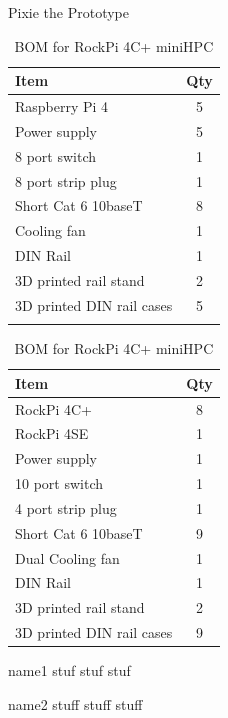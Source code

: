 \documentclass[final]{beamer}
\newlength{\sepwidth}
\newlength{\colwidth}
\newcommand{\separatorcolumn}{\begin{column}{\sepwidth}\end{column}}
\begin{document}
\begin{frame}[t]
\begin{columns}[t]
\begin{column}{\colwidth}
				\begin{alertblock}{Pixie the Prototype}
					\begin{table}
						\parbox{.45\linewidth}{
						\centering
						\begin{tabular}{l c}
							\textbf{Item} & \textbf{Qty} \\
							\hline
							Raspberry Pi 4 & 5 \\
							Power supply & 5 \\
							8 port switch & 1 \\
							8 port strip plug & 1 \\
							Short Cat 6 10baseT & 8 \\
							Cooling fan & 1 \\
							DIN Rail & 1 \\
							3D printed rail stand & 2 \\
							3D printed DIN rail cases & 5 \\
							 & \\
						\end{tabular}
						\caption{BOM for Prototype miniHPC using Raspberry Pi 4s}			
						}
						\hfill
						\parbox{.45\linewidth}{
						\centering
						\begin{tabular}{l c}
							\textbf{Item} & \textbf{Qty} \\
							\hline
							RockPi 4C+ & 8 \\
							RockPi 4SE & 1 \\
							Power supply & 1 \\
							10 port switch & 1 \\
							4 port strip plug & 1 \\
							Short Cat 6 10baseT & 9 \\
							Dual Cooling fan & 1 \\
							DIN Rail & 1 \\
							3D printed rail stand & 2 \\
							3D printed DIN rail cases & 9 \\
						\end{tabular}
						\caption{BOM for RockPi 4C+ miniHPC}				
						}
					\end{table}
				\end{alertblock}	
			
			\parbox{.45\linewidth}{
			\centering
			\begin{block}{name1}
				stuf stuf stuf
			\end{block}
			}
			\hfill
			\parbox{.45\linewidth}{
			\centering
			\begin{block}{name2}
				stuff stuff stuff
			\end{block}
			}
						
			\end{column}			
			\separatorcolumn
		\end{columns}
	\end{frame}
	
\end{document}
